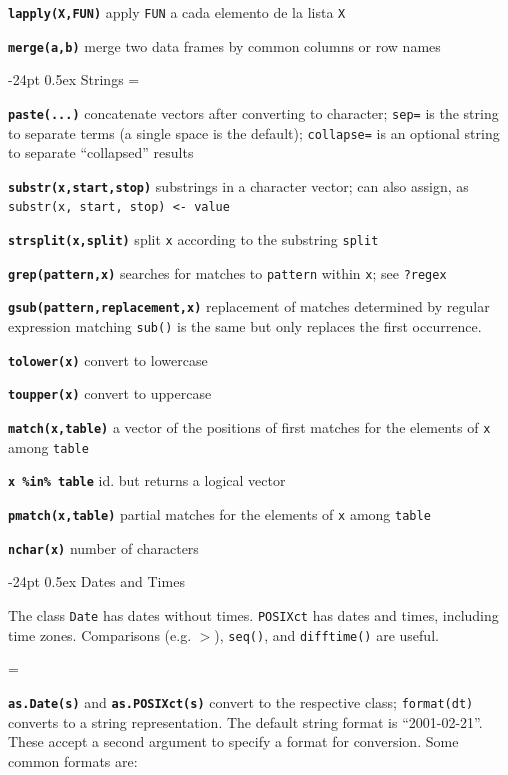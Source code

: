 \documentclass[10pt,landscape]{article}
\makeatletter
\renewcommand\section{\@startsection{section}{1}{0mm}%
                                     {-24pt}%
                                     {0.5ex}%
                                {\color[rgb]{1,0.54902,0}\normalfont\large\bfseries}}
\newcommand{\code}{\texttt}
\newcommand{\bcode}[1]{\texttt{\textbf{#1}}}
\makeatother
\begin{document}
\begin{multicols*}{3}
\bcode{lapply(X,FUN)} apply \code{FUN} a cada elemento de la lista \code{X}

\bcode{merge(a,b)} merge two data frames by common columns or row names




\section{Strings}
\everypar={\hangindent=9mm}

\bcode{paste(...)} concatenate vectors after converting to character;
\code{sep=} is the string to separate terms (a single space is the default);
\code{collapse=} is an optional string to separate ``collapsed'' results

\bcode{substr(x,start,stop)} substrings in a character vector; can also assign, as \code{substr(x, start, stop) <- value}

\bcode{strsplit(x,split)} split \code{x} according to the substring \code{split}

\bcode{grep(pattern,x)} searches for matches to \code{pattern}
     within \code{x}; see \code{?regex}

\bcode{gsub(pattern,replacement,x)} replacement of matches determined by
regular expression matching \code{sub()} is the same but only
replaces the first occurrence. 

\bcode{tolower(x)} convert to lowercase

\bcode{toupper(x)} convert to uppercase

\bcode{match(x,table)} a vector of the positions of first matches for the elements of \code{x} among \code{table}

\bcode{x \%in\% table} id. but returns a logical vector 

\bcode{pmatch(x,table)} partial matches for the elements of \code{x} among \code{table}

\bcode{nchar(x)} number of characters


\section{\color[rgb]{1,0.54902,0}Dates and Times}

The class \code{Date} has dates without times.  \code{POSIXct} has
dates and times, including time zones. Comparisons (e.g. $>$),
\code{seq()}, and \code{difftime()} are useful.

\everypar={\hangindent=9mm}

\bcode{as.Date(s)} and \bcode{as.POSIXct(s)} convert to the respective
class; \code{format(dt)} converts to a string representation. The
default string format is ``2001-02-21''. These accept a second argument
to specify a format for conversion. Some common formats are:


\end{multicols*}
\end{document}
